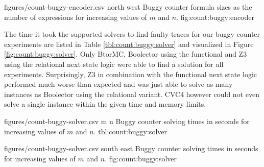 \newpage

\EncoderStatsGraph
  {figures/count-buggy-encoder.csv}
  {north west}
  {Buggy counter formula sizes as the number of expressions for increasing values of $m$ and $n$.}
  {fig:count:buggy:encoder}

The time it took the supported solvers to find faulty traces for our buggy counter experiments are listed in Table \ref{tbl:count:buggy:solver} and visualized in Figure \ref{fig:count:buggy:solver}.
Only BtorMC, Boolector using the functional and Z3 using the relational next state logic were able to find a solution for all experiments.
Surprisingly, Z3 in combination with the functional next state logic performed much worse than expected and was just able to solve as many instances as Boolector using the relational variant.
CVC4 however could not even solve a single instance within the given time and memory limits.

\bigbreak

\SolverStatsTable
  {figures/count-buggy-solver.csv}
  {m n}
  {\CountRowHeader}
  {Buggy counter solving times in seconds for increasing values of $m$ and $n$.}
  {tbl:count:buggy:solver}

\newpage

\SolverStatsGraph
  {figures/count-buggy-solver.csv}
  {south east}
  {Buggy counter solving times in seconds for increasing values of $m$ and $n$.}
  {fig:count:buggy:solver}


